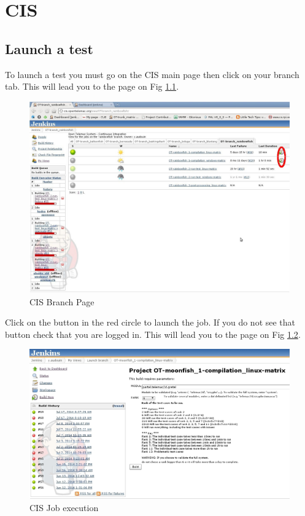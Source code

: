 %
\chapter{CIS}
%
%
\section{Launch a test}
%
%
To launch a test you must go on the CIS main page then click on your branch tab.
This will lead you to the page on Fig \ref{fig:cis-main}.
%
\begin{figure}[H]
    \centering
    \includegraphics[scale=0.35]{graphics/cis-main.jpg}
    \caption{CIS Branch Page}
    \label{fig:cis-main}
\end{figure}
%
Click on the button in the red circle to launch the job. If you do not see that
button check that you are logged in. This will lead you to the page on Fig
\ref{fig:cis-run-job}.
%
\begin{figure}[H]
    \centering
    \includegraphics[scale=0.35]{graphics/cis-run-job.jpg}
    \caption{CIS Job execution}
    \label{fig:cis-run-job}
\end{figure}
